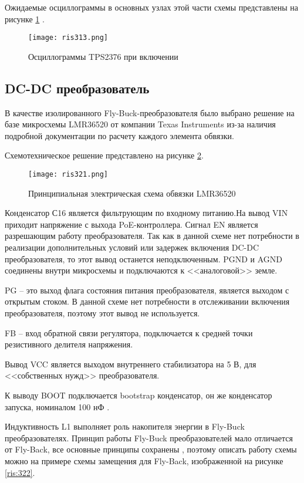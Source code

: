 Ожидаемые осциллограммы в основных узлах этой части схемы представлены на рисунке 
\ref{ris:313} \cite{TPS2376:datasheet}.

\begin{figure}[H]
    \centering
    \texttt{[image: ris313.png]}
    \caption{Осциллограммы TPS2376 при включении}
    \label{ris:313}
\end{figure}

\subsection{DC-DC преобразователь}
\hspace{1cm} 

В качестве изолированного Fly-Buck-преобразователя было выбрано решение на базе микросхемы LMR36520 
от компании Texas Instruments из-за наличия подробной документации по расчету каждого элемента
обвязки. 

Схемотехническое решение представлено на рисунке \ref{ris:321}.

\begin{figure}[H]
    \centering
    \texttt{[image: ris321.png]}
    \caption{Принципиальная электрическая схема обвязки LMR36520}
    \label{ris:321}
\end{figure}

Конденсатор С16 является фильтрующим по входному питанию.На вывод VIN приходит напряжение
с выхода PoE-контроллера. Сигнал EN является разрешающим работу преобразователя. Так как
в данной схеме нет потребности в реализации дополнительных условий или задержек включения
DC-DC преобразователя, то этот вывод останется неподключенным. PGND и AGND соединены внутри 
микросхемы и подключаются к <<аналоговой>> земле. 

PG -- это выход флага состояния питания преобразователя, является выходом с открытым стоком. 
В данной схеме нет потребности в отслеживании включения преобразователя, поэтому этот вывод не 
используется. 

FB -- вход обратной связи регулятора, подключается к средней точки резистивного делителя
напряжения.

Вывод VCC является выходом внутреннего стабилизатора на 5 В, для <<собственных нужд>> преобразователя.

К выводу BOOT подключается bootstrap конденсатор, он же конденсатор запуска, номиналом 100 нФ 
\cite{LMR36520:datasheet}. 

Индуктивность L1 выполняет роль накопителя энергии в Fly-Buck преобразователях. 
Принцип работы Fly-Buck преобразователей мало отличается от Fly-Back, все основные принципы сохранены
\cite{IsoTopol},
поэтому описать работу схемы можно на примере схемы замещения для Fly-Back, 
изображенной на рисунке \ref{ris:322}.

